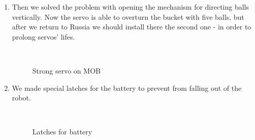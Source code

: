 \begin{enumerate}
	\item Then we solved the problem with opening the mechanism for directing balls vertically. Now the servo is able to overturn the bucket with five balls, but after we return to Russia we should install there the second one - in order to prolong servos' lifes.
	\begin{figure}[H]
		\begin{minipage}[h]{0.2\linewidth}
			\center  
		\end{minipage}
		\begin{minipage}[h]{0.6\linewidth}
			\caption{Strong servo on MOB}
		\end{minipage}
	\end{figure}
	
	\item We made special latches for the battery to prevent from falling out of the robot.
	\begin{figure}[H]
		\begin{minipage}[h]{0.2\linewidth}
			\center  
		\end{minipage}
		\begin{minipage}[h]{0.6\linewidth}
			\caption{Latches for battery}
		\end{minipage}
	\end{figure}
	

\end{enumerate}

